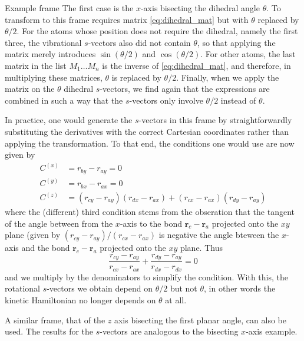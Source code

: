 \documentclass{article}
\newcommand{\vect}[1]{\boldsymbol{#1}}
\begin{document}
\begin{subsection}{Example frame}
	The first case is the $x$-axis bisecting the dihedral angle $\theta$. To transform to this frame requires matrix \ref{eq:dihedral_mat} but with $\theta$ replaced by $\theta/2$. For the atoms whose position does not require the dihedral, namely the first three, the vibrational $s$-vectors also did not contain $\theta$, so that applying the matrix merely introduces $\sin (\theta/2)$ and $\cos (\theta/2)$. For other atoms, the last matrix in the list $M_1 \ldots M_n$ is the inverse of \ref{eq:dihedral_mat}, and therefore, in multiplying these matrices, $\theta$ is replaced by $\theta/2$. Finally, when we apply the matrix on the $\theta$ dihedral $s$-vectors, we find again that the expressions are combined in such a way that the $s$-vectors only involve $\theta/2$ instead of $\theta$. 

	In practice, one would generate the $s$-vectors in this frame by straightforwardly substituting the derivatives with the correct Cartesian coordinates rather than applying the transformation. To that end, the conditions one would use are now given by
	\[
		\begin{split}
			C^{(x)} &= r_{by} - r_{ay}  = 0\\
			C^{(y)} &= r_{bx} - r_{ax}  = 0\\
			C^{(z)} &= (r_{cy} - r_{ay})(r_{dx} - r_{ax}) + (r_{cx} - r_{ax})(r_{dy} - r_{ay})
		\end{split}
	\]
	where the (different) third condition stems from the obseration that the tangent of the angle between from the $x$-axis to the bond $\vect{r}_c - \vect{r}_a$ projected onto the $xy$ plane (given by $(r_{cy} -r_{ay})/(r_{cx} - r_{ax})$ is negative the angle bteween the $x$-axis and the bond $\vect{r}_c - \vect{r}_a$ projected onto the $xy$ plane. Thus 
	\[
		\frac{r_{cy} - r_{ay}}{r_{cx} - r_{ax}} + \frac{r_{dy} - r_{ay}}{r_{dx} - r_{dx}} = 0
	\]
	and we multiply by the denominators to simplify the condition. With this, the rotational $s$-vectors we obtain depend on $\theta/2$ but not $\theta$, in other words the kinetic Hamiltonian no longer depends on $\theta$ at all. 

	A similar frame, that of the $z$ axis bisecting the first planar angle, can also be used. The results for the $s$-vectors are analogous to the bisecting $x$-axis example. 
\end{subsection}
\end{document}
